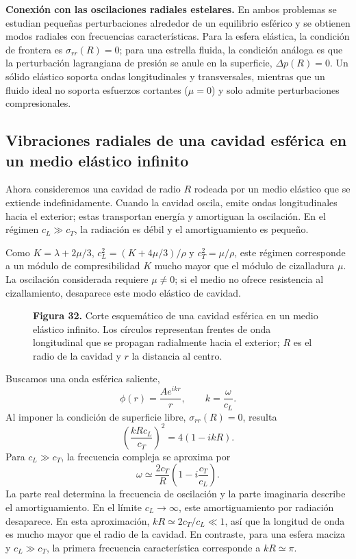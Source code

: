 \textbf{Conexión con las oscilaciones radiales estelares.}
En ambos problemas se estudian pequeñas perturbaciones alrededor de un equilibrio esférico y se obtienen modos radiales con frecuencias características. Para la esfera elástica, la condición de frontera es $\sigma_{rr}(R)=0$; para una estrella fluida, la condición análoga es que la perturbación lagrangiana de presión se anule en la superficie, $\Delta p(R)=0$. Un sólido elástico soporta ondas longitudinales y transversales, mientras que un fluido ideal no soporta esfuerzos cortantes ($\mu=0$) y solo admite perturbaciones compresionales.

\subsection{Vibraciones radiales de una cavidad esférica en un medio elástico infinito}

Ahora consideremos una cavidad de radio $R$ rodeada por un medio elástico que se extiende indefinidamente. Cuando la cavidad oscila, emite ondas longitudinales hacia el exterior; estas transportan energía y amortiguan la oscilación. En el régimen $c_L\gg c_T$, la radiación es débil y el amortiguamiento es pequeño.

Como $K=\lambda+2\mu/3$, $c_L^2=(K+4\mu/3)/\rho$ y $c_T^2=\mu/\rho$, este régimen corresponde a un módulo de compresibilidad $K$ mucho mayor que el módulo de cizalladura $\mu$. La oscilación considerada requiere $\mu\ne0$; si el medio no ofrece resistencia al cizallamiento, desaparece este modo elástico de cavidad.

\begin{figure}[H]
\centering

\par\medskip
\textbf{Figura 32.} Corte esquemático de una cavidad esférica en un medio elástico infinito. Los círculos representan frentes de onda longitudinal que se propagan radialmente hacia el exterior; $R$ es el radio de la cavidad y $r$ la distancia al centro.
\end{figure}

Buscamos una onda esférica saliente,
\[
\phi(r)=\frac{A e^{ikr}}{r},
\qquad k=\frac{\omega}{c_L}.
\]
Al imponer la condición de superficie libre, $\sigma_{rr}(R)=0$, resulta
\[
\left(\frac{kR c_L}{c_T}\right)^2=4(1-ikR).
\]
Para $c_L\gg c_T$, la frecuencia compleja se aproxima por
\[
\omega\simeq\frac{2c_T}{R}\left(1-i\frac{c_T}{c_L}\right).
\]
La parte real determina la frecuencia de oscilación y la parte imaginaria describe el amortiguamiento. En el límite $c_L\to\infty$, este amortiguamiento por radiación desaparece. En esta aproximación, $kR\simeq2c_T/c_L\ll1$, así que la longitud de onda es mucho mayor que el radio de la cavidad. En contraste, para una esfera maciza y $c_L\gg c_T$, la primera frecuencia característica corresponde a $kR\simeq\pi$.

